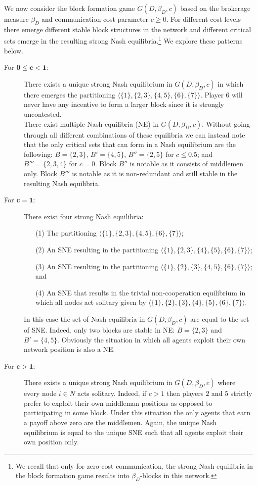 We now consider the block formation game $G (D, \beta_D ,c)$ based on the brokerage measure $\beta_D$ and communication cost parameter $c \geqslant 0$. For different cost levels there emerge different stable block structures in the network and different critical sets emerge in the resulting strong Nash equilibria.\footnote{We recall that only for zero-cost communication, the strong Nash equilibria in the block formation game results into $\beta_D$-blocks in this network.} We explore these patterns below.
\begin{description}
\item[For $\mathbf{0 \leqslant c < 1}$:]
There exists a unique strong Nash equilibrium in $G (D, \beta_D ,c)$ in which there emerges the partitioning $\langle \{ 1 \} , \{2,3\} , \{4,5\} , \{ 6 \} , \{ 7 \} \rangle$. Player $6$ will never have any incentive to form a larger block since it is strongly uncontested.
\\
There exist multiple Nash equilibria (NE) in $G (D, \beta_D ,c)$. Without going through all different combinations of these equilibria we can instead note that the only critical sets that can form in a Nash equilibrium are the following: $B = \{2,3\}$, $B' = \{4,5\}$, $B'' = \{2,5\}$ for $c \leqslant 0.5$; and $B''' = \{2,3,4\}$ for $c=0$. Block $B''$ is notable as it consists of middlemen only. Block $B'''$ is notable as it is non-redundant and still stable in the resulting Nash equilibria.

\item[For $\mathbf{c = 1}$:]
There exist four strong Nash equilibria:
\begin{itemize}
\item[(1)] The partitioning $\langle \{ 1 \} , \{2,3\} , \{4,5\} , \{ 6 \} , \{ 7 \} \rangle$;
\item[(2)] An SNE resulting in the partitioning $\langle \{ 1 \} , \{2,3\} , \{4 \}, \{5\} , \{ 6 \} , \{ 7 \} \rangle$;
\item[(3)] An SNE resulting in the partitioning $\langle \{ 1 \} , \{2\} , \{3\} , \{4,5\} , \{ 6 \} , \{ 7 \} \rangle$; and
\item[(4)] An SNE that results in the trivial non-cooperation equilibrium in which all nodes act solitary given by $\langle \{ 1 \} , \{ 2\} ,\{ 3\} , \{ 4 \} , \{ 5 \} , \{ 6 \} , \{ 7 \} \rangle$.
\end{itemize}
In this case the set of Nash equilibria in $G (D, \beta_D ,c)$ are equal to the set of SNE. Indeed, only two blocks are stable in NE: $B=\{2,3\}$ and $B'=\{4,5\}$. Obviously the situation in which all agents exploit their own network position is also a NE.

\item[For $\mathbf{c > 1}$:]
There exists a unique strong Nash equilibrium in $G (D, \beta_D ,c)$ where every node $i \in N$ acts solitary. Indeed, if $c > 1$ then players $2$ and $5$ strictly prefer to exploit their own middleman positions as opposed to participating in some block. Under this situation the only agents that earn a payoff above zero are the middlemen. Again, the unique Nash equilibrium is equal to the unique SNE such that all agents exploit their own position only.
\end{description}
